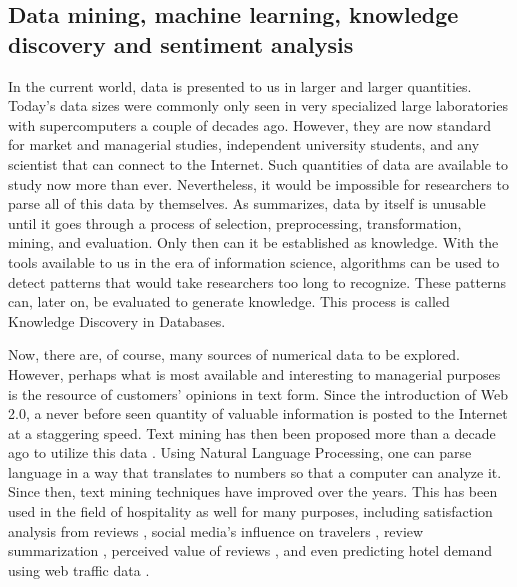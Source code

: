\documentclass[smallextended,natbib]{svjour3}       %
\begin{document}
  \subsection{Data mining, machine learning, knowledge discovery and sentiment analysis}\label{theory_data}

    In the current world, data is presented to us in larger and larger quantities. Today's data sizes were commonly only seen in very specialized large laboratories with supercomputers a couple of decades ago. However, they are now standard for market and managerial studies, independent university students, and any scientist that can connect to the Internet. Such quantities of data are available to study now more than ever. Nevertheless, it would be impossible for researchers to parse all of this data by themselves. As \cite{fayyad1996data} summarizes, data by itself is unusable until it goes through a process of selection, preprocessing, transformation, mining, and evaluation. Only then can it be established as knowledge. With the tools available to us in the era of information science, algorithms can be used to detect patterns that would take researchers too long to recognize. These patterns can, later on, be evaluated to generate knowledge. This process is called Knowledge Discovery in Databases. 

    Now, there are, of course, many sources of numerical data to be explored.  However, perhaps what is most available and interesting to managerial purposes is the resource of customers' opinions in text form. Since the introduction of Web 2.0, a never before seen quantity of valuable information is posted to the Internet at a staggering speed. Text mining has then been proposed more than a decade ago to utilize this data \cite[e.g.][]{rajman1998text,nahm2002text}. Using Natural Language Processing, one can parse language in a way that translates to numbers so that a computer can analyze it. Since then, text mining techniques have improved over the years. This has been used in the field of hospitality as well for many purposes, including satisfaction analysis from reviews \cite[e.g][]{berezina2016, xu2016, xiang2015, hargreaves2015, balbi2018}, social media's influence on travelers \cite[e.g.][]{xiang2010}, review summarization \cite[e.g.][]{hu2017436}, perceived value of reviews \cite[e.g][]{FANG2016498}, and even predicting hotel demand using web traffic data \cite[e.g][]{yang2014}.
\end{document}
